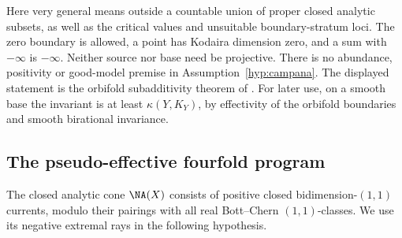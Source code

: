 Here very general means outside a countable union of proper closed
analytic subsets, as well as the critical values and unsuitable
boundary-stratum loci. The zero boundary is allowed, a point has
Kodaira dimension zero, and a sum with \(-\infty\) is
\(-\infty\). Neither source nor base need be projective. There is
no abundance, positivity or good-model premise in
Assumption~\ref{hyp:campana}. The displayed statement is the orbifold
subadditivity theorem of \cite[Theorem~1.1]{GrantCampana}. For later use,
on a smooth base the invariant
is at least \(\kappa(Y,K_Y)\), by effectivity of the orbifold
boundaries and smooth birational invariance.

\subsection{The pseudo-effective fourfold program}

The closed analytic cone \(\NA(X)\) consists of positive closed
bidimension-\((1,1)\) currents, modulo their pairings with all real
Bott--Chern \((1,1)\)-classes. We use its negative extremal rays in
the following hypothesis.

